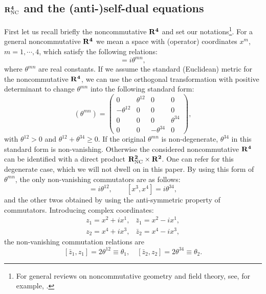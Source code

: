 \documentclass[a4paper,a4paper]{article}
\begin{document}
\subsection{$\bf{R}_{\rm  NC}^4$ and  the (anti-)self-dual
equations}

First let us recall briefly the noncommutative $\bf{R}^4$ and set
our notations\footnote{For general reviews on noncommutative
geometry and field theory, see, for example, \cite{Paperc,
Reviewa, Reviewb, Reviewc}.}. For a general noncommutative
$\bf{R}^4$ we mean a space with (operator) coordinates $x^m$,
$m=1, \cdots, 4$, which satisfy the following relations:
\begin{equation}
[x^m,x^n] = i \theta^{mn},
\end{equation}
where $\theta^{mn}$ are real constants. If we assume the standard
(Euclidean) metric for the noncommutative $\bf{R}^4$, we can use
the orthogonal transformation with positive determinant to change
$\theta^{mn}$ into the following standard form:
\begin{equation}
\label{theta} (\theta^{mn})=\left(\begin{array}{cccc} 0 &
\theta^{12} & 0 & 0 \\ -\theta^{12}& 0 & 0 & 0 \\ 0 & 0 & 0
&\theta^{34}\\ 0 & 0 & -\theta^{34}& 0 \end{array}\right),
\end{equation}
with $\theta^{12}>0$ and $\theta^{12}+\theta^{34}\geq 0$. If the
original $\theta^{mn}$ is non-degenerate, $\theta^{34}$ in this
standard form is non-vanishing. Otherwise the considered
noncommutative $\bf{R}^4$ can be identified with a direct product
$\bf{R}_{\rm  NC}^2\times\bf{R}^2$. One can refer \cite{degen} for
this degenerate case, which we will not dwell on in this paper. By
using this form of $\theta^{mn}$, the only non-vanishing
commutators are as follows:
\begin{equation}
[x^1,x^2] = i \theta^{12}, \qquad [x^3,x^4] = i \theta^{34},
\end{equation}
and the other twos obtained by using the anti-symmetric property
of commutators. Introducing complex coordinates:
\begin{equation}
\label{complex}
\begin{array}{rl}
z_1 = x^2 + i x^1 , & \bar{z}_1 = x^2 - i x^1, \\
z_2 = x^4 + i x^3 , & \bar{z}_2 = x^4 - i x^3,
\end{array}
\end{equation}
the non-vanishing commutation relations are
\begin{equation}
\label{commutator of z} [\bar
z_1,z_1]=2\theta^{12}\equiv\theta_1,\quad [\bar z_2,z_2]
=2\theta^{34}\equiv\theta_2.
\end{equation}
\end{document}
